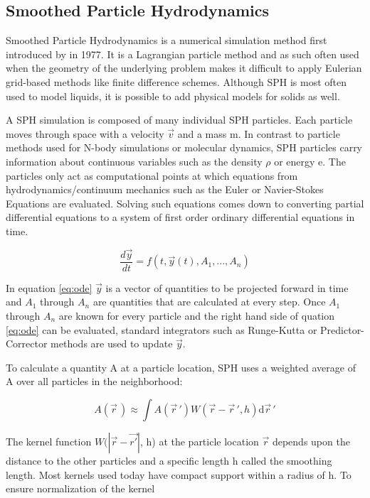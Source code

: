 \subsection{Smoothed Particle Hydrodynamics}
Smoothed Particle Hydrodynamics is a numerical simulation method first introduced by \cite{Monaghan_1977} in 1977. It is a Lagrangian particle method and as such often used when the geometry of the underlying problem makes it difficult to apply Eulerian grid-based methods like finite difference schemes. Although SPH is most often used to model liquids, it is possible to add physical models for solids as well.

A SPH simulation is composed of many individual SPH particles. Each particle moves through space with a velocity $\vec{v}$ and a mass m. In contrast to particle methods used for N-body simulations or molecular dynamics, SPH particles carry information about continuous variables such as the density $\rho$ or energy e. The particles only act as computational points at which equations from hydrodynamics/continuum mechanics such as the Euler or Navier-Stokes Equations are evaluated. Solving such equations comes down to converting partial differential equations to a system of first order ordinary differential equations in time.

\begin{equation} \label{eq:ode}
    \frac{d\vec{y}}{dt} = f(t, \vec{y}(t), A_1, ..., A_n)
\end{equation}

In equation \ref{eq:ode} $\vec{y}$ is a vector of quantities to be projected forward in time and $A_1$ through $A_n$ are quantities that are calculated at every step. Once $A_1$ through $A_n$ are known for every particle and the right hand side of quation \ref{eq:ode} can be evaluated, standard integrators such as Runge-Kutta or Predictor-Corrector methods are used to update $\vec{y}$.

To calculate a quantity A at a particle location, SPH uses a weighted average of A over all particles in the neighborhood:

\begin{equation}
    A(\vec{r}\,) \approx \int A(\vec{r}\,') W(\vec{r} - \vec{r}\,', h) \mathrm d\vec{r}\,'
\end{equation}

The kernel function $W(|\vec{r} - \vec{r'}|$, h) at the particle location $\vec{r}$ depends upon the distance to the other particles and a specific length h called the smoothing length. Most kernels used today have compact support within a radius of h. To ensure normalization of the kernel


